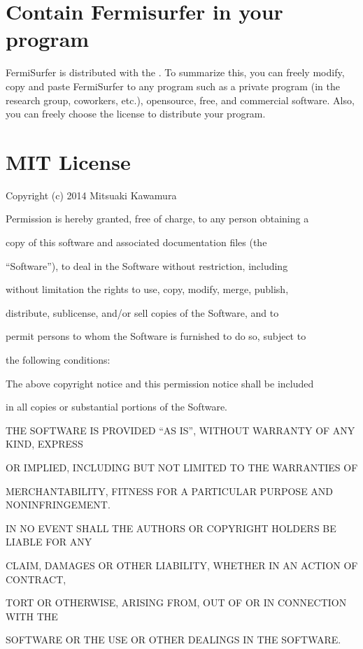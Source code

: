 \documentclass[letterpaper,10pt,pdftex,openany,english]{sphinxmanual}
\begin{document}
\section{Contain Fermisurfer in your program}
\label{\detokenize{copy:contain-fermisurfer-in-your-program}}
\sphinxAtStartPar
FermiSurfer is distributed with the {\hyperref[\detokenize{copy:mitlicense}]{}}.
To summarize this, you can freely modify, copy and paste FermiSurfer to any program
such as a private program (in the research group, co\sphinxhyphen{}workers, etc.),
open\sphinxhyphen{}source, free, and commercial software.
Also, you can freely choose the license to distribute your program.


\section{MIT License}
\label{\detokenize{copy:mit-license}}\label{\detokenize{copy:mitlicense}}
\begin{DUlineblock}{0em}
\item[] Copyright (c) 2014 Mitsuaki Kawamura
\item[] 
\item[] Permission is hereby granted, free of charge, to any person obtaining a
\item[] copy of this software and associated documentation files (the
\item[] “Software”), to deal in the Software without restriction, including
\item[] without limitation the rights to use, copy, modify, merge, publish,
\item[] distribute, sublicense, and/or sell copies of the Software, and to
\item[] permit persons to whom the Software is furnished to do so, subject to
\item[] the following conditions:
\item[] 
\item[] The above copyright notice and this permission notice shall be included
\item[] in all copies or substantial portions of the Software.
\item[] 
\item[] THE SOFTWARE IS PROVIDED “AS IS”, WITHOUT WARRANTY OF ANY KIND, EXPRESS
\item[] OR IMPLIED, INCLUDING BUT NOT LIMITED TO THE WARRANTIES OF
\item[] MERCHANTABILITY, FITNESS FOR A PARTICULAR PURPOSE AND NONINFRINGEMENT.
\item[] IN NO EVENT SHALL THE AUTHORS OR COPYRIGHT HOLDERS BE LIABLE FOR ANY
\item[] CLAIM, DAMAGES OR OTHER LIABILITY, WHETHER IN AN ACTION OF CONTRACT,
\item[] TORT OR OTHERWISE, ARISING FROM, OUT OF OR IN CONNECTION WITH THE
\item[] SOFTWARE OR THE USE OR OTHER DEALINGS IN THE SOFTWARE.
\end{DUlineblock}
\end{document}
